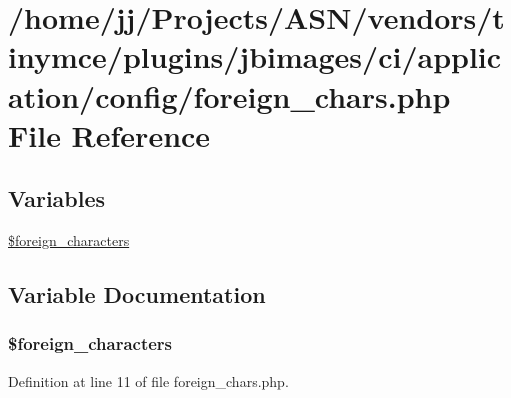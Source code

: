 \hypertarget{foreign__chars_8php}{}\section{/home/jj/\+Projects/\+A\+S\+N/vendors/tinymce/plugins/jbimages/ci/application/config/foreign\+\_\+chars.php File Reference}
\label{foreign__chars_8php}
\subsection*{Variables}
\begin{DoxyCompactItemize}
\item 
\hyperlink{foreign__chars_8php_a77bf091eac4b63b8efea27293e5ca79b}{\$foreign\+\_\+characters}
\end{DoxyCompactItemize}


\subsection{Variable Documentation}
\subsubsection[{\texorpdfstring{\$foreign\+\_\+characters}{$foreign_characters}}]{\setlength{\rightskip}{0pt plus 5cm}\$foreign\+\_\+characters}\hypertarget{foreign__chars_8php_a77bf091eac4b63b8efea27293e5ca79b}{}\label{foreign__chars_8php_a77bf091eac4b63b8efea27293e5ca79b}


Definition at line 11 of file foreign\+\_\+chars.\+php.

